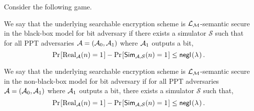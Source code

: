 \begin{definition}
	Consider the following game.
	
	\begin{pchstack}[center]
		
		\pchspace
	\end{pchstack}
	
	We say that the underlying searchable encryption scheme is $\mathcal{L}_\mathcal{M}$-semantic secure in the black-box model for bit adversary if there exists a simulator $\mathcal{S}$ such that for all PPT adversaries $\mathcal{A} = (\mathcal{A}_0, \mathcal{A}_1)$ where $\mathcal{A}_1$ outputs a bit,
	\begin{equation}
	\prob{\text{Real}_\adv(n) = 1} - \prob{\simulator_\mathcal{\adv,S}(n) = 1} \leq \negl.
	\end{equation}
	
	We say that the underlying searchable encryption scheme is $\mathcal{L}_\mathcal{M}$-semantic secure in the non-black-box model for bit adversary if for all PPT adversaries $\mathcal{A} = (\mathcal{A}_0, \mathcal{A}_1)$ where $\mathcal{A}_1$ outputs a bit, there exists a simulator $\mathcal{S}$ such that,
	\begin{equation}
	\prob{\text{Real}_\adv(n) = 1} - \prob{\simulator_\mathcal{\adv,S}(n) = 1} \leq \negl.
	\end{equation}
\end{definition}


